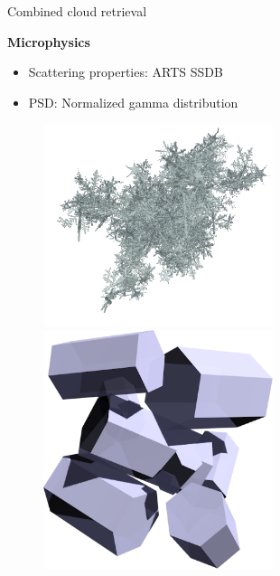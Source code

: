 \documentclass[final,hyperref={pdfpagelabels=false}]{beamer}
\begin{document}
\begin{frame}
\begin{columns}[t]
\begin{column}{.48\linewidth}
\begin{block}{Combined cloud retrieval}
          \begin{minipage}[b]{0.6\textwidth}
          \textbf{Microphysics}
           \begin{itemize}
             \item Scattering properties:  ARTS SSDB \citep{arts_ssdb}
             \item PSD: Normalized gamma distribution \citep{delanoe}
           \end{itemize}
           \vfill
           \vspace{2cm}
           \begin{figure}
             \centering
           \begin{minipage}{0.8\textwidth}
             \begin{minipage}{0.5\textwidth}
               \includegraphics[width = 0.6\textwidth]{../plots/evans_snow_aggregate}
             \end{minipage}\hfill%
             \begin{minipage}{0.5\textwidth}
               \includegraphics[width = 0.6\textwidth]{../plots/8column_aggregate}

\end{minipage}
\end{minipage}
\end{figure}
\end{minipage}
\end{block}
\end{column}
\end{columns}
\end{frame}
\end{document}
